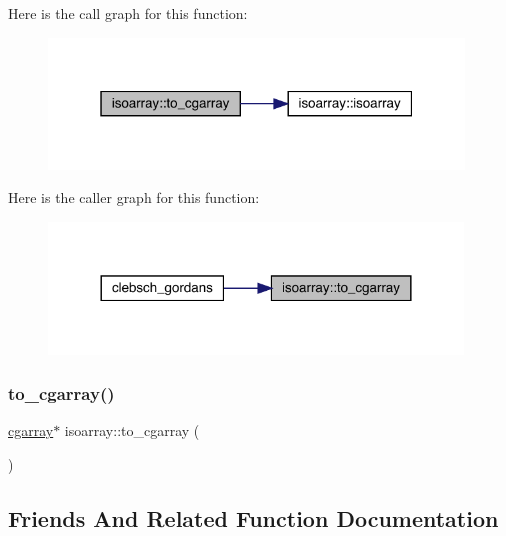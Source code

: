 Here is the call graph for this function\+:\nopagebreak
\begin{figure}[H]
\begin{center}
\leavevmode
\includegraphics[width=313pt]{d5/dd9/classisoarray_a6af30a576928cf3005c5c6464e64b70e_cgraph}
\end{center}
\end{figure}
Here is the caller graph for this function\+:\nopagebreak
\begin{figure}[H]
\begin{center}
\leavevmode
\includegraphics[width=312pt]{d5/dd9/classisoarray_a6af30a576928cf3005c5c6464e64b70e_icgraph}
\end{center}
\end{figure}
\mbox{\label{classisoarray_a66ca849c4b34cafeee945037d814a8dc}} 
\subsubsection{\texorpdfstring{to\_cgarray()}{to\_cgarray()}\hspace{0.1cm}{\footnotesize\ttfamily [2/2]}}
{\footnotesize\ttfamily \mbox{\hyperlink{classcgarray}{cgarray}}$\ast$ isoarray\+::to\+\_\+cgarray (\begin{DoxyParamCaption}{ }\end{DoxyParamCaption})}



\subsection{Friends And Related Function Documentation}
\mbox{\label{classisoarray_a27c452d0372903eeb416af9256dacd0f}} 
